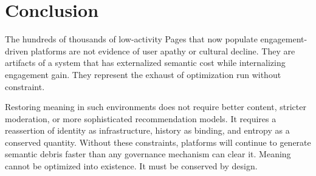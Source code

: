 \documentclass[11pt,oneside]{article}
\begin{document}
\section{Conclusion}

The hundreds of thousands of low-activity Pages that now populate engagement-driven platforms are not evidence of user apathy or cultural decline. They are artifacts of a system that has externalized semantic cost while internalizing engagement gain. They represent the exhaust of optimization run without constraint.

Restoring meaning in such environments does not require better content, stricter moderation, or more sophisticated recommendation models. It requires a reassertion of identity as infrastructure, history as binding, and entropy as a conserved quantity. Without these constraints, platforms will continue to generate semantic debris faster than any governance mechanism can clear it. Meaning cannot be optimized into existence. It must be conserved by design.
\end{document}
